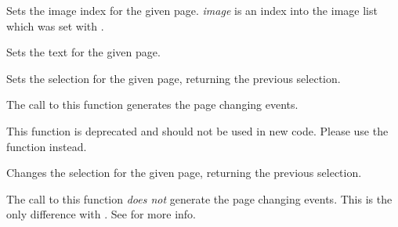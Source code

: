 Sets the image index for the given page. {\it image} is an index into
the image list which was set with .


\label{wxnotebooksetpagetext}


Sets the text for the given page.


\label{wxnotebooksetselection}


Sets the selection for the given page, returning the previous selection.

The call to this function generates the page changing events.

This function is deprecated and should not be used in new code. Please use the
 function instead.





\label{wxnotebookchangeselection}


Changes the selection for the given page, returning the previous selection.

The call to this function \emph{does not} generate the page changing events.
This is the only difference with .
See  for more info.
